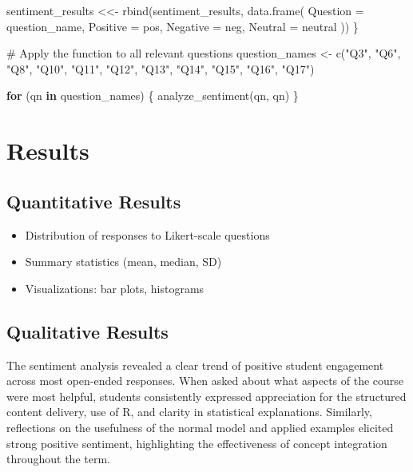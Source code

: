 \documentclass[
  letterpaper,
  DIV=11,
  numbers=noendperiod]{scrartcl}
\newenvironment{Shaded}{\begin{snugshade}}{\end{snugshade}}
\newcommand{\AttributeTok}[1]{\textcolor[rgb]{0.40,0.45,0.13}{#1}}
\newcommand{\CommentTok}[1]{\textcolor[rgb]{0.37,0.37,0.37}{#1}}
\newcommand{\ControlFlowTok}[1]{\textcolor[rgb]{0.00,0.23,0.31}{\textbf{#1}}}
\newcommand{\FunctionTok}[1]{\textcolor[rgb]{0.28,0.35,0.67}{#1}}
\newcommand{\NormalTok}[1]{\textcolor[rgb]{0.00,0.23,0.31}{#1}}
\newcommand{\OtherTok}[1]{\textcolor[rgb]{0.00,0.23,0.31}{#1}}
\newcommand{\StringTok}[1]{\textcolor[rgb]{0.13,0.47,0.30}{#1}}
\providecommand{\tightlist}{%
  \setlength{\itemsep}{0pt}\setlength{\parskip}{0pt}}\usepackage{longtable,booktabs,array}
\begin{document}
\begin{Shaded}
\begin{Highlighting}[]
\NormalTok{  sentiment\_results }\OtherTok{\textless{}\textless{}{-}} \FunctionTok{rbind}\NormalTok{(sentiment\_results, }\FunctionTok{data.frame}\NormalTok{(}
    \AttributeTok{Question =}\NormalTok{ question\_name,}
    \AttributeTok{Positive =}\NormalTok{ pos,}
    \AttributeTok{Negative =}\NormalTok{ neg,}
    \AttributeTok{Neutral =}\NormalTok{ neutral}
\NormalTok{  ))}
\NormalTok{\}}

\CommentTok{\# Apply the function to all relevant questions}
\NormalTok{question\_names }\OtherTok{\textless{}{-}} \FunctionTok{c}\NormalTok{(}\StringTok{"Q3"}\NormalTok{, }\StringTok{"Q6"}\NormalTok{, }\StringTok{"Q8"}\NormalTok{, }\StringTok{"Q10"}\NormalTok{, }\StringTok{"Q11"}\NormalTok{, }
                    \StringTok{"Q12"}\NormalTok{, }\StringTok{"Q13"}\NormalTok{, }\StringTok{"Q14"}\NormalTok{, }\StringTok{"Q15"}\NormalTok{, }\StringTok{"Q16"}\NormalTok{, }\StringTok{"Q17"}\NormalTok{)}

\ControlFlowTok{for}\NormalTok{ (qn }\ControlFlowTok{in}\NormalTok{ question\_names) \{}
  \FunctionTok{analyze\_sentiment}\NormalTok{(qn, qn)}
\NormalTok{\}}
\end{Highlighting}
\end{Shaded}

\section{Results}\label{results}

\subsection{Quantitative Results}\label{quantitative-results}

\begin{itemize}
\tightlist
\item
  Distribution of responses to Likert-scale questions
\item
  Summary statistics (mean, median, SD)
\item
  Visualizations: bar plots, histograms
\end{itemize}

\subsection{Qualitative Results}\label{qualitative-results}

The sentiment analysis revealed a clear trend of positive student
engagement across most open-ended responses. When asked about what
aspects of the course were most helpful, students consistently expressed
appreciation for the structured content delivery, use of R, and clarity
in statistical explanations. Similarly, reflections on the usefulness of
the normal model and applied examples elicited strong positive
sentiment, highlighting the effectiveness of concept integration
throughout the term.
\end{document}
